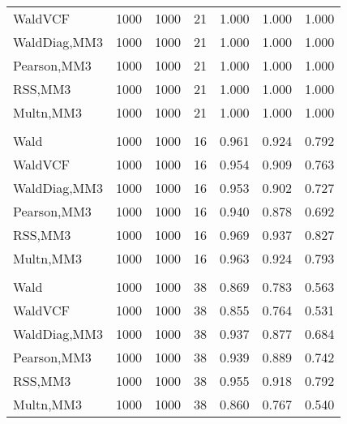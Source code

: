 \documentclass[
]{article}
\begin{document}
\begin{table}[H]
{\begin{tabular}[t]{lrrrrrr}
\hspace{1em}WaldVCF & 1000 & 1000 & 21 & 1.000 & 1.000 & 1.000\\
\hspace{1em}WaldDiag,MM3 & 1000 & 1000 & 21 & 1.000 & 1.000 & 1.000\\
\hspace{1em}Pearson,MM3 & 1000 & 1000 & 21 & 1.000 & 1.000 & 1.000\\
\hspace{1em}RSS,MM3 & 1000 & 1000 & 21 & 1.000 & 1.000 & 1.000\\
\hspace{1em}Multn,MM3 & 1000 & 1000 & 21 & 1.000 & 1.000 & 1.000\\
\addlinespace[0.3em]
\multicolumn{7}{l}{\textbf{2F 10V}}\\
\hspace{1em}Wald & 1000 & 1000 & 16 & 0.961 & 0.924 & 0.792\\
\hspace{1em}WaldVCF & 1000 & 1000 & 16 & 0.954 & 0.909 & 0.763\\
\hspace{1em}WaldDiag,MM3 & 1000 & 1000 & 16 & 0.953 & 0.902 & 0.727\\
\hspace{1em}Pearson,MM3 & 1000 & 1000 & 16 & 0.940 & 0.878 & 0.692\\
\hspace{1em}RSS,MM3 & 1000 & 1000 & 16 & 0.969 & 0.937 & 0.827\\
\hspace{1em}Multn,MM3 & 1000 & 1000 & 16 & 0.963 & 0.924 & 0.793\\
\addlinespace[0.3em]
\multicolumn{7}{l}{\textbf{3F 15V}}\\
\hspace{1em}Wald & 1000 & 1000 & 38 & 0.869 & 0.783 & 0.563\\
\hspace{1em}WaldVCF & 1000 & 1000 & 38 & 0.855 & 0.764 & 0.531\\
\hspace{1em}WaldDiag,MM3 & 1000 & 1000 & 38 & 0.937 & 0.877 & 0.684\\
\hspace{1em}Pearson,MM3 & 1000 & 1000 & 38 & 0.939 & 0.889 & 0.742\\
\hspace{1em}RSS,MM3 & 1000 & 1000 & 38 & 0.955 & 0.918 & 0.792\\
\hspace{1em}Multn,MM3 & 1000 & 1000 & 38 & 0.860 & 0.767 & 0.540\\
\bottomrule
\end{tabular}}
\endgroup{}
\end{table}
\end{document}
